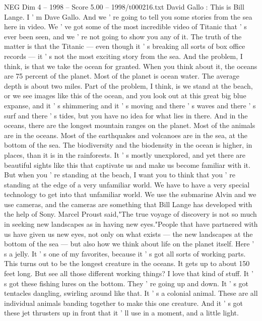 \begin{textsample}{NEG Dim 4 – 1998 – Score 5.00 – 1998/t000216.txt}  \label{ex:f4_neg_071}
David Gallo : This is Bill Lange.
I ' m Dave Gallo.
And we ' re going to tell you some stories from the sea here in video.
We ' ve got some of the most incredible video of Titanic that ' s ever been seen, and we ' re not going to show you any of it.
The truth of the matter is that the Titanic — even though it ' s breaking all sorts of box office records — it ' s not the most exciting story from the sea.
And the problem, I think, is that we take the ocean for granted.
When you think about it, the oceans are 75 percent of the planet.
Most of the planet is ocean water.
The average depth is about two miles.
Part of the problem, I think, is we stand at the beach, or we see images like this of the ocean, and you look out at this great big blue expanse, and it ' s shimmering and it ' s moving and there ' s waves and there ' s surf and there ' s tides, but you have no idea for what lies in there.
And in the oceans, there are the longest mountain ranges on the planet.
Most of the animals are in the oceans.
Most of the earthquakes and volcanoes are in the sea, at the bottom of the sea.
The biodiversity and the biodensity in the ocean is higher, in places, than it is in the rainforests.
It ' s mostly unexplored, and yet there are beautiful sights like this that captivate us and make us become familiar with it.
But when you ' re standing at the beach, I want you to think that you ' re standing at the edge of a very unfamiliar world.
We have to have a very special technology to get into that unfamiliar world.
We use the submarine Alvin and we use cameras, and the cameras are something that Bill Lange has developed with the help of Sony.
Marcel Proust said,"The true voyage of discovery is not so much in seeking new landscapes as in having new eyes."People that have partnered with us have given us new eyes, not only on what exists — the new landscapes at the bottom of the sea — but also how we think about life on the planet itself.
Here ' s a jelly.
It ' s one of my favorites, because it ' s got all sorts of working parts.
This turns out to be the longest creature in the oceans.
It gets up to about 150 feet long.
But see all those different working things?
I love that kind of stuff.
It ' s got these fishing lures on the bottom.
They ' re going up and down.
It ' s got tentacles dangling, swirling around like that.
It ' s a colonial animal.
These are all individual animals banding together to make this one creature.
And it ' s got these jet thrusters up in front that it ' ll use in a moment, and a little light.

\end{textsample}
